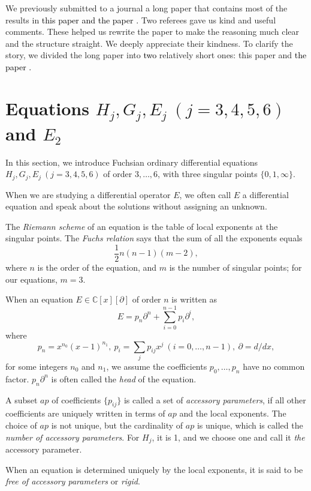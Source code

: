 \documentclass[a4paper,12pt]{article}
\theoremstyle{definition}
\theoremstyle{remark}
\numberwithin{equation}{section} %
\newcommand{\red}[1]{\textcolor{black}{#1}}
\begin{document}
\par\smallskip\noindent
We previously submitted to a journal a long paper that contains most of the results in \red{this paper and the paper \cite{HOSY2}.}  Two referees gave us kind and useful comments. These helped us rewrite the paper to make the reasoning much clear and the structure straight. We deeply appreciate their kindness. To clarify the story, we divided the long paper into \red{two} relatively short ones: this paper and \red{the paper \cite{HOSY2}. }

 
   \newpage
\section{Equations $H_j,G_j,E_j\ (j=3,4,5,6)$ and $E_2$}\label{TheTen}
\secttoc
In this section, we introduce Fuchsian ordinary differential equations $H_j,G_j,E_j\ (j=3,4,5,6)$ of order $3,\dots,6$, with three singular points $\{0,1,\infty\}$.

When we are studying a differential operator $E$, we often call $E$ a differential equation and speak about the solutions without assigning an unknown.

The {\it Riemann scheme} of an equation  is the table of local exponents
at the singular points. The {\it Fuchs relation} says that
the sum of all the exponents equals
\begin{equation}\label{Fuchsrelation}
  \frac12n(n-1)(m-2),\end{equation}
where $n$ is the order of the equation,
and $m$ is the number of singular points;
for our equations, $m=3$.

When an equation $E\in\mathbb{C}[x][\partial]$ of order $n$ is written as
$$E=p_n\partial^n+\sum_{i=0}^{n-1}p_i\partial^i,$$
where
$$ p_n=x^{n_0}(x-1)^{n_1},\  p_i=\sum_jp_{ij}x^j\ (i=0,\dots,n-1),\ \partial=d/dx,$$
for some integers $n_0$ and $n_1$, we assume the coefficients $p_0,\dots, p_n$ have no common factor. $p_n\partial^n$ is often called the {\it head} of the equation.

A subset $ap$ of coefficients $\{p_{ij}\}$ is called a set of {\it accessory parameters}, if all other coefficients are uniquely written in terms of $ap$ and the local exponents. The choice of $ap$ is not unique, but the cardinality of $ap$ is unique, which is called the {\it number of accessory parameters}. For $H_j$, it is 1, and we choose one and call it {\it the} accessory parameter.

When an equation is determined uniquely by the local exponents,
it is said to be {\it free of accessory parameters} or {\it rigid}.
\end{document}
